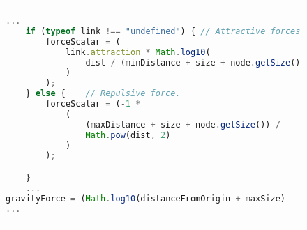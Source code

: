 \begin{figure}[H]
\noindent\rule{\textwidth}{1pt}
\begin{lstlisting}[language=JavaScript, caption={Force calculation to space out data-structures for visualization}, label={lst:getTotalForce}]
    ...
    if (typeof link !== "undefined") { // Attractive forces
        forceScalar = (
            link.attraction * Math.log10(
                dist / (minDistance + size + node.getSize())
            )
        );
    } else {    // Repulsive force.
        forceScalar = (-1 *
            (
                (maxDistance + size + node.getSize()) /
                Math.pow(dist, 2)
            )
        );

    }
    ...
gravityForce = (Math.log10(distanceFromOrigin + maxSize) - Math.log10(maxSize - distanceFromOrigin)) * gravityForce;
...
\end{lstlisting}
\noindent\rule{\textwidth}{1pt}
\end{figure}

